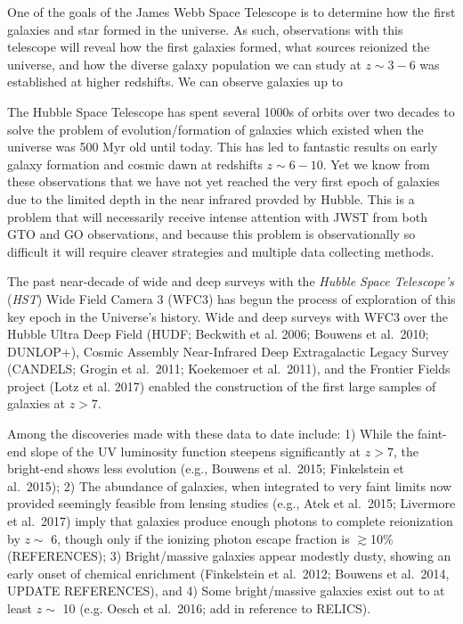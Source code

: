 \documentclass[12pt]{article}
\begin{document}
\clearpage

\justification          %

One of the goals of the James Webb Space Telescope is to determine how the first galaxies and star formed in the universe.   As such, observations with this telescope will reveal how the first galaxies formed, what sources reionized the universe, and how the diverse galaxy population we can study at $z \sim 3-6$ was established at higher redshifts.  We can observe galaxies up to

The Hubble Space Telescope has spent several 1000s of orbits over two decades to solve the problem of evolution/formation of galaxies which existed when the universe was 500 Myr old until today. This has led to fantastic results on early galaxy formation and cosmic dawn at redshifts $z \sim 6-10$. Yet we know from these observations that we have not yet reached the very first epoch of galaxies due to the limited depth in the near infrared provded by Hubble. This is a problem that will necessarily receive intense attention with JWST from both GTO and GO observations, and because this problem is observationally so difficult it will require cleaver strategies and multiple data collecting methods.

The past near-decade of wide and deep surveys with the {\it Hubble Space Telescope’s} ({\it HST}) Wide Field Camera 3 (WFC3) has begun the process of exploration of this key epoch in the Universe’s history.  Wide and deep surveys with WFC3 over the Hubble Ultra Deep Field (HUDF; Beckwith et al. 2006; Bouwens et al.\ 2010; DUNLOP+), Cosmic Assembly Near-Infrared Deep Extragalactic Legacy Survey (CANDELS; Grogin et al.\ 2011; Koekemoer et al.\ 2011), and the Frontier Fields project (Lotz et al. 2017) enabled the construction of the first large samples of galaxies at $z>7$.  

Among the discoveries made with these data to date include: 1) While the faint-end slope of the UV luminosity function steepens significantly at $z>7$, the bright-end shows less evolution (e.g., Bouwens et al.\ 2015; Finkelstein et al.\ 2015); 2) The abundance of galaxies, when integrated to very faint limits now provided seemingly feasible from lensing studies (e.g., Atek et al.\ 2015; Livermore et al.\ 2017) imply that galaxies produce enough photons to complete reionization by $z\sim$ 6, though only if the ionizing photon escape fraction is $\gtrsim$10\% (REFERENCES); 3) Bright/massive galaxies appear modestly dusty, showing an early onset of chemical enrichment (Finkelstein et al.\ 2012; Bouwens et al.\ 2014, UPDATE REFERENCES), and 4) Some bright/massive galaxies exist out to at least $z \sim$ 10 (e.g. Oesch et al.\ 2016; add in reference to RELICS).
\end{document}
